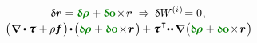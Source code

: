 \nopagebreak\vspace{-0.25em}\begin{equation*}
\begin{array}{c}
\variation{\currentlocationvector} = \constvarvector{\hspace{-0.1ex}\bm{\rho}} \hspace{.1ex} + \constvarvector{o} \hspace{-0.33ex} \times \hspace{-0.33ex} \currentlocationvector
\hspace{.66ex}\Rightarrow\hspace{.4ex}
\variation{\internalwork} \hspace{-0.2ex} = 0
\hspace{.1ex} ,
\\[.2em]
%
\bigl( \hspace{.1ex} \boldnabla \dotp \cauchystress \hspace{.1ex} + \hspace{-0.1ex} \rho \hspace{-0.1ex} \massloadvector \hspace{.16ex} \bigr)
\hspace{-0.25ex} \dotp \hspace{-0.25ex}
\bigl(  \constvarvector{\hspace{-0.1ex}\bm{\rho}} \hspace{.1ex} + \constvarvector{o} \hspace{-0.33ex} \times \hspace{-0.33ex} \currentlocationvector \hspace{.2ex} \bigr) \hspace{-0.16ex}
+ \cauchystress^{\hspace{.16ex}\T} \hspace{-0.5ex}
\dotdotp
\hspace{-0.16ex} \boldnabla \hspace{.1ex} \bigl(
\constvarvector{\hspace{-0.1ex}\bm{\rho}} \hspace{.1ex} +
\constvarvector{o} \hspace{-0.33ex} \times \hspace{-0.33ex} \currentlocationvector \hspace{.2ex} \bigr) \hspace{-0.25ex}

\end{array}
\end{equation*}
